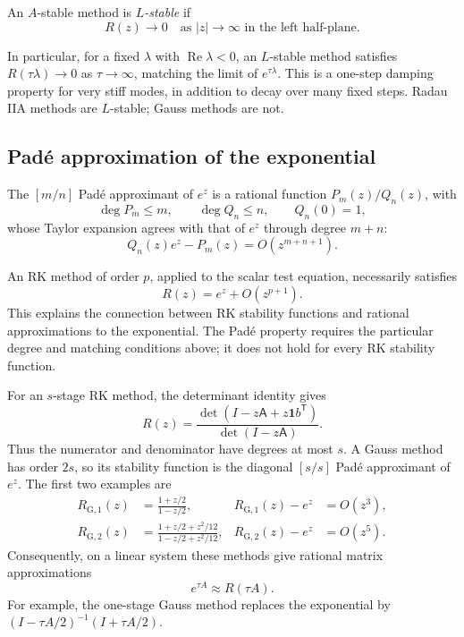 \begin{definition}[\(L\)-stability]
 An \(A\)-stable method is \emph{\(L\)-stable} if
 \[
  R(z)\longrightarrow0
  \quad\text{as }|z|\to\infty\text{ in the left half-plane}.
 \]
\end{definition}

In particular, for a fixed \(\lambda\) with
\(\operatorname{Re}\lambda<0\), an \(L\)-stable method satisfies
\(R(\tau\lambda)\to0\) as \(\tau\to\infty\), matching the
limit of \(e^{\tau\lambda}\). This is a one-step damping property
for very stiff modes, in addition to decay over many fixed steps.
Radau IIA methods are \(L\)-stable; Gauss methods are not.

\subsection{Pad\'e approximation of the exponential}

\begin{definition}
 The \([m/n]\) Pad\'e approximant of \(e^z\) is a rational
 function \(P_m(z)/Q_n(z)\), with
 \[
  \deg P_m\leq m,\qquad \deg Q_n\leq n,\qquad Q_n(0)=1,
 \]
 whose Taylor expansion agrees with that of \(e^z\) through
 degree \(m+n\):
 \begin{equation}\label{eq:pade-matching-sep-28}
  Q_n(z)e^z-P_m(z)=O(z^{m+n+1}).
 \end{equation}
\end{definition}

An RK method of order \(p\), applied to the scalar test equation,
necessarily satisfies
\[
 R(z)=e^z+O(z^{p+1}).
\]
This explains the connection between RK stability functions and
rational approximations to the exponential. The Pad\'e property
requires the particular degree and matching conditions above;
it does not hold for every RK stability function.

For an \(s\)-stage RK method, the determinant identity gives
\[
 R(z)=
 \frac{\det(I-z\mathsf A+z\mathbf1 b^{\mathsf T})}
      {\det(I-z\mathsf A)}.
\]
Thus the numerator and denominator have degrees at most \(s\).
A Gauss method has order \(2s\), so its stability function is
the diagonal \([s/s]\) Pad\'e approximant of \(e^z\).
The first two examples are
\begin{align*}
 R_{\mathrm{G},1}(z)&=\frac{1+z/2}{1-z/2},
 &R_{\mathrm{G},1}(z)-e^z&=O(z^3),\\
 R_{\mathrm{G},2}(z)&=\frac{1+z/2+z^2/12}{1-z/2+z^2/12},
 &R_{\mathrm{G},2}(z)-e^z&=O(z^5).
\end{align*}
Consequently, on a linear system these methods give rational
matrix approximations
\[
 e^{\tau A}\approx R(\tau A).
\]
For example, the one-stage Gauss method replaces the exponential by
\((I-\tau A/2)^{-1}(I+\tau A/2)\).

